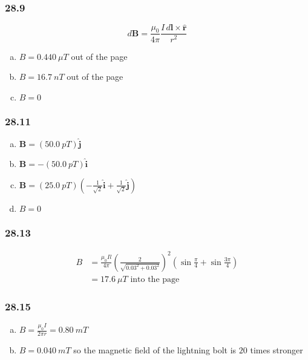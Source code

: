 \documentclass{article}
\begin{document}
\subsubsection{28.9}

\[d \mathbf{B} = \frac{\mu_0}{4 \pi} \frac{I \,d \mathbf{l} \times \hat{\mathbf{r}}}{r^2}\]

\begin{enumerate}[(a)]
  \item $B = \qty{0.440}{\mu T}$ out of the page

  \item $B = \qty{16.7}{n T}$ out of the page

  \item $B = 0$
\end{enumerate}

\subsubsection{28.11}

\begin{enumerate}[(a)]
  \item $\mathbf{B} = (\qty{50.0}{p T}) \hat{\mathbf{j}}$

  \item $\mathbf{B} = -(\qty{50.0}{p T}) \hat{\mathbf{i}}$

  \item $\mathbf{B} = (\qty{25.0}{p T}) (-\frac{1}{\sqrt{2}} \hat{\mathbf{i}} + \frac{1}{\sqrt{2}} \hat{\mathbf{j}})$

  \item $B = 0$
\end{enumerate}

\subsubsection{28.13}

\begin{align*}
  B & = \frac{\mu_0 I l}{4 \pi} \left( \frac{2}{\sqrt{0.03^2 + 0.03^2}} \right)^2 \left( \sin \frac{\pi}{4} + \sin \frac{3 \pi}{4} \right) \\
    & = \qty{17.6}{\mu T} \textrm{ into the page}
\end{align*}

\subsubsection{28.15}

\begin{enumerate}[(a)]
  \item $B = \frac{\mu_0 I}{2 \pi r} = \qty{0.80}{m T}$

  \item $B = \qty{0.040}{m T}$ so the magnetic field of the lightning bolt is $20$ times stronger
\end{enumerate}
\end{document}
